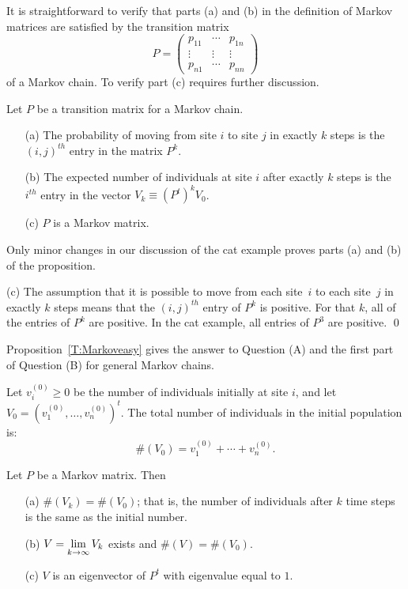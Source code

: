 It is straightforward to verify that parts (a) and (b) in the definition of
Markov matrices are satisfied by the transition matrix
\[
P = \left(\begin{array}{ccc} p_{11} & \cdots & p_{1n} \\
	\vdots & \vdots & \vdots \\ p_{n1} & \cdots & p_{nn}
\end{array}\right)
\]
of a Markov chain.  To verify part (c) requires further discussion.

\begin{prop}   \label{T:Markoveasy}
Let $P$ be a transition matrix for a
Markov chain.
\begin{enumerate}
\item[(a)]  The probability of moving from site $i$ to site $j$ in exactly
$k$ steps is the $(i,j)^{th}$ entry in the matrix $P^k$.
\item[(b)]  The expected number of individuals at site $i$ after exactly $k$
steps is the $i^{th}$ entry in the vector $V_k\equiv (P^t)^kV_0$.
\item[(c)]  $P$ is a Markov matrix.
\end{enumerate}
\end{prop}

\proof Only minor changes in our discussion of the cat example proves parts
(a) and (b) of the proposition.

(c) The assumption that it is possible to move from each site~$i$ to each
site~$j$ in exactly $k$ steps means that the $(i,j)^{th}$ entry of $P^k$ is
positive.  For that $k$, all of the entries of $P^k$ are positive.  In the
cat example, all entries of $P^3$ are positive.  \qed

Proposition~\ref{T:Markoveasy} gives the answer to Question (A) and the first
part of Question (B) for general Markov chains.

Let $v_i^{(0)}\ge 0$ be the number of individuals initially at site $i$, and
let $V_0=(v_1^{(0)},\ldots,v_n^{(0)})^t$.  The total number of individuals
in the initial population is:
\[
\#(V_0) = v_1^{(0)} + \cdots + v_n^{(0)}.
\]

\begin{thm}  \label{T:Markov}
Let $P$ be a Markov matrix.  Then
\begin{enumerate}
\item[(a)]  $\#(V_k)=\#(V_0)$; that is, the number of individuals after $k$
time steps is the same as the initial number.
\item[(b)]  $\displaystyle V = \lim_{k\to\infty}V_k$ exists and $\#(V)=\#(V_0)$.
\item[(c)]  $V$ is an eigenvector of $P^t$ with eigenvalue equal to $1$.
\end{enumerate}
\end{thm}

